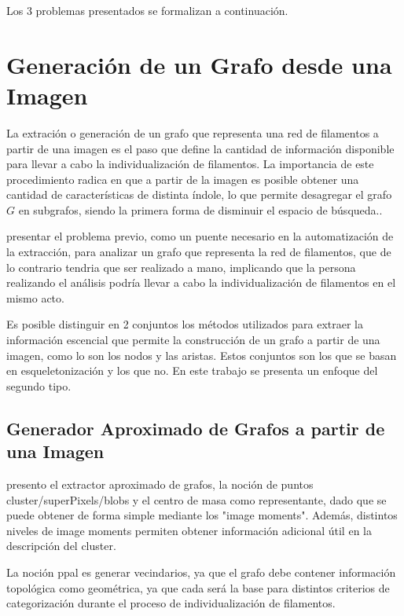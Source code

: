 Los 3 problemas presentados se formalizan a continuaci\'on.

\section{Generaci\'on de un Grafo desde una Imagen}
La extraci\'on o generaci\'on de un grafo que representa una red de filamentos a partir de una imagen es el paso que define la cantidad de informaci\'on disponible para llevar a cabo la individualizaci\'on de filamentos. La importancia de este procedimiento radica en que a partir de la imagen es posible obtener una cantidad de caracter\'isticas de distinta \'indole, lo que permite desagregar el grafo $G$ en subgrafos, siendo la primera forma de disminuir el espacio de b\'usqueda.. 


presentar el problema previo, como un puente necesario en la 
automatizaci\'on de la extracci\'on,  para analizar un grafo que representa la red de filamentos, que de lo contrario tendria que ser realizado a mano, implicando que la persona realizando el análisis podría llevar a cabo la individualizaci\'on de filamentos en el mismo acto.

Es posible distinguir en 2 conjuntos los m\'etodos utilizados para extraer la informaci\'on escencial que permite la construcci\'on de un grafo a partir de una imagen, como lo son los nodos y las aristas. Estos conjuntos son los que se basan en esqueletonizaci\'on\cite{lavado2018comparacion} y los que no. En este trabajo se presenta un enfoque del segundo tipo.

\subsection{Generador Aproximado de Grafos a partir de una Imagen}
presento el extractor aproximado de grafos, la noción de puntos cluster/superPixels/blobs y el centro de masa como representante, dado que se puede obtener de forma simple mediante los "image moments". Además, distintos niveles de image moments permiten obtener información adicional útil en la descripción del cluster.

La noción ppal es generar vecindarios, ya que el grafo debe contener información topológica como geométrica, ya que cada será la base para distintos criterios de categorización durante el proceso de individualización de filamentos. 

